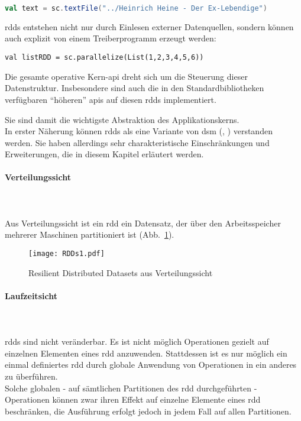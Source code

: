 \begin{lstlisting}[language=Scala]
val text = sc.textFile("../Heinrich Heine - Der Ex-Lebendige")
\end{lstlisting}

\Glspl{rdd} entstehen nicht nur durch Einlesen externer Datenquellen, sondern können auch explizit von einem Treiberprogramm erzeugt werden:\\

\begin{lstlisting}
val listRDD = sc.parallelize(List(1,2,3,4,5,6))
\end{lstlisting}

Die gesamte operative Kern-\gls{api} dreht sich um die Steuerung dieser Datenstruktur. Insbesondere sind auch die in den Standardbibliotheken verfügbaren "`höheren"' \glspl{api} auf diesen \glspl{rdd} implementiert.

Sie sind damit die wichtigste Abstraktion des Applikationskerns.\\

In erster Näherung können \glspl{rdd} als eine Variante von \gls{dsm} (\cite{Nitzberg:1991:DSM:112827.112855}, \cite{Mat12}) verstanden werden. Sie haben allerdings sehr charakteristische Einschränkungen und Erweiterungen, die in diesem Kapitel erläutert werden.\\

\paragraph{Verteilungssicht}\\

\\
Aus Verteilungssicht ist ein \gls{rdd} ein Datensatz, der über den Arbeitsspeicher mehrerer Maschinen partitioniert ist (Abb.~\ref{fig:rdds1}).

\begin{figure}[ht!]
	\centering
  \texttt{[image: RDDs1.pdf]}
	\caption{Resilient Distributed Datasets aus Verteilungssicht}
	\label{fig:rdds1}
\end{figure}

\paragraph{Laufzeitsicht}\\

\\
\Glspl{rdd} sind nicht veränderbar. Es ist nicht möglich Operationen gezielt auf einzelnen Elementen eines \gls{rdd} anzuwenden. Stattdessen ist es nur möglich ein einmal definiertes \gls{rdd} durch globale Anwendung von Operationen in ein anderes zu überführen.\\
Solche globalen - auf sämtlichen Partitionen des \gls{rdd} durchgeführten - Operationen können zwar ihren Effekt auf einzelne Elemente eines \gls{rdd} beschränken, die Ausführung erfolgt jedoch in jedem Fall auf allen Partitionen.\\

